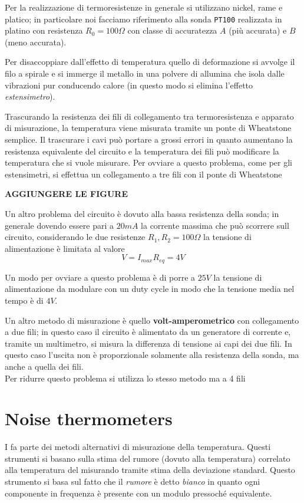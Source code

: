 	Per la realizzazione di termoresistenze in generale si utilizzano nickel, rame e platico; in particolare noi facciamo riferimento alla sonda \texttt{PT100} realizzata in platino con resistenza $R_0 = 100 \Omega$ con classe di accuratezza $A$ (più accurata) e $B$ (meno accurata).
	
	Per disaccoppiare dall'effetto di temperatura quello di deformazione si avvolge il filo a spirale e si immerge il metallo in una polvere di allumina che isola dalle vibrazioni pur conducendo calore (in questo modo si elimina l'effetto \textit{estensimetro}).
	
	Trascurando la resistenza dei fili di collegamento tra termoresistenza e apparato di misurazione, la temperatura viene misurata tramite un ponte di Wheatstone semplice. Il trascurare i cavi può portare a grossi errori in quanto aumentano la resistenza equivalente del circuito e la temperatura dei fili può modificare la temperatura che si vuole misurare. Per ovviare a questo problema, come per gli estensimetri, si effettua un collegamento a tre fili con il ponte di Wheatstone
	
	\textbf{AGGIUNGERE LE FIGURE} 
	
	Un altro problema del circuito è dovuto alla bassa resistenza della sonda; in generale dovendo essere pari a $20mA$ la corrente massima che può scorrere sull circuito, considerando le due resistenze $R_1,R_2= 100\Omega$ la tensione di alimentazione è limitata al valore
	\[ V= I_{max} R_{eq} = 4V \]
	
	Un modo per ovviare a questo problema è di porre a $25V$ la tensione di alimentazione da modulare con un duty cycle in modo che la tensione media nel tempo è di $4V$.
	
	Un altro metodo di misurazione è quello \textbf{volt-amperometrico} con collegamento a due fili; in questo caso il circuito è alimentato da un generatore di corrente e, tramite un multimetro, si misura la differenza di tensione ai capi dei due fili. In questo caso l'uscita non è proporzionale solamente alla resistenza della sonda, ma anche a quella dei fili. \\
	Per ridurre questo problema si utilizza lo stesso metodo ma a 4 fili
	
	
	
\section{Noise thermometers}
	I  fa parte dei metodi alternativi di misurazione della temperatura.  Questi strumenti si basano sulla stima del rumore (dovuto alla temperatura) correlato alla temperatura del misurando tramite stima della deviazione standard. Questo strumento si basa sul fatto che il \textit{rumore} è detto \textit{bianco} in quanto ogni componente in frequenza è presente con un modulo pressoché equivalente.
	
